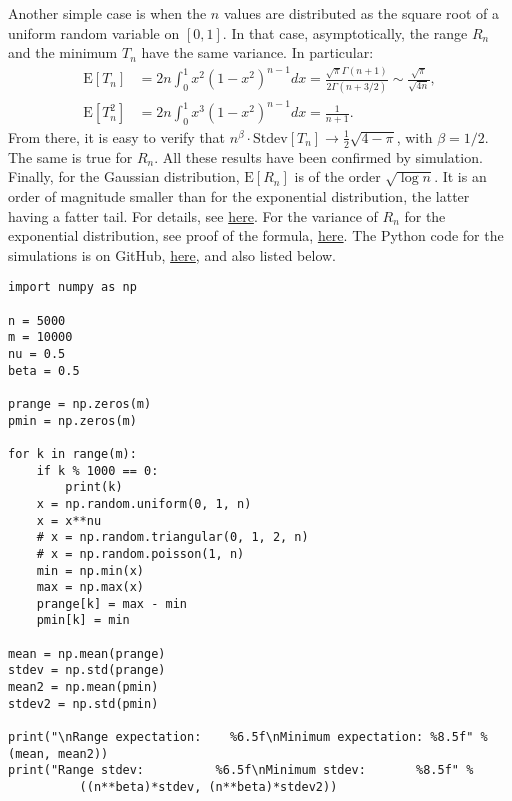 \documentclass[oneside,10pt]{book}
\begin{document}
Another simple case is when the $n$ values are distributed as the square root of a uniform random variable on $[0, 1]$. In that case, 
 asymptotically, the range $R_n$ and the minimum $T_n$ have the same variance. In particular:
\begin{align}
\text{E}[T_n] & = 2n\int_0^1 x^2(1-x^2)^{n-1} dx = \frac{\sqrt{\pi}\Gamma(n+1)}{2\Gamma(n + 3/2)} \sim \frac{\sqrt{\pi}}{\sqrt{4n}},
 \nonumber\\
\text{E}[T_n^2] & = 2n\int_0^1 x^3(1-x^2)^{n-1} dx = \frac{1}{n+1}. \nonumber
\end{align}
From there, it is easy to verify that $n^{\beta}\cdot\text{Stdev}[T_n] \rightarrow \frac{1}{2}\sqrt{4 - \pi}$, with $\beta = 1/2$. The same is true
 for $R_n$. All these results have been confirmed by simulation. Finally, for the Gaussian distribution,
 $\text{E}[R_n]$ is of the order $\sqrt{\log n}$. It is an order of magnitude smaller than for the exponential distribution, the latter having a fatter tail. For details, see \href{https://stats.stackexchange.com/questions/9001/approximate-order-statistics-for-normal-random-variables}{here}. For the variance of $R_n$ for the exponential distribution, see proof of the formula, \href{https://github.com/VincentGranville/Statistical-Optimization/blob/main/exporange.pdf}{here}. The Python code for the simulations is on GitHub, 
 \href{https://github.com/VincentGranville/Statistical-Optimization/blob/main/Range_simulations.py}{here}, and also listed below.
\vspace{1ex}

\begin{lstlisting}
import numpy as np

n = 5000
m = 10000
nu = 0.5
beta = 0.5

prange = np.zeros(m)
pmin = np.zeros(m)

for k in range(m):
    if k % 1000 == 0:
        print(k)
    x = np.random.uniform(0, 1, n)
    x = x**nu
    # x = np.random.triangular(0, 1, 2, n)
    # x = np.random.poisson(1, n)
    min = np.min(x)
    max = np.max(x)
    prange[k] = max - min
    pmin[k] = min

mean = np.mean(prange)
stdev = np.std(prange)   
mean2 = np.mean(pmin)
stdev2 = np.std(pmin)

print("\nRange expectation:    %6.5f\nMinimum expectation: %8.5f" %(mean, mean2))
print("Range stdev:          %6.5f\nMinimum stdev:       %8.5f" %
          ((n**beta)*stdev, (n**beta)*stdev2))  


\end{lstlisting}
\end{document}

